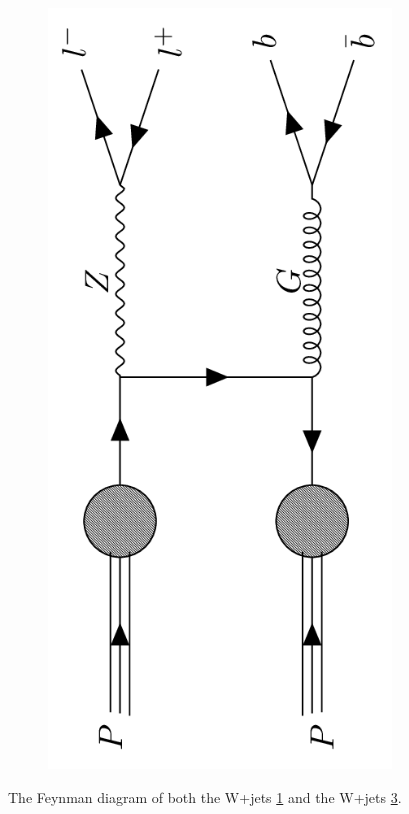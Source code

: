 \begin{figure}
{\begin{subfigure}{.2\textwidth}
        \caption{}
        \label{fig:w_pjets}
    \end{subfigure}
    \hfill
    \begin{subfigure}{.2\textwidth}
        \includegraphics[width=\textwidth, angle = -90]{Figures/FDiagrams/Z_pjets.png}
        \caption{}
        \label{fig:z_pjets}
    \end{subfigure}
    }
    \caption{The Feynman diagram of both the W+jets \ref{fig:w_pjets} and the W+jets \ref{fig:z_pjets}.}
\end{figure}

